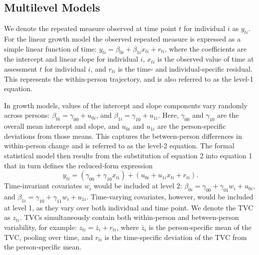 \subsection{Multilevel Models}
We denote the repeated measure observed at time point $t$ for individual $i$ as $y_{ti}$. For the linear growth model the observed repeated measure is expressed as a simple linear function of time: $y_{ti} = \beta_{0i} + \beta_{1i} x_{ti} + r_{ti}$, where the coefficients are the intercept and linear slope for individual $i$, $x_{ti}$ is the observed value of time at assessment $t$ for individual $i$, and $r_{ti}$ is the time- and individual-specific residual. This represents the within-person trajectory, and is also referred to as the level-1 equation. 

In growth models, values of the intercept and slope components vary randomly across persons: $\beta_{0i} = \gamma_{00} + u_{0i}$, and $\beta_{1i} = \gamma_{10} + u_{1i}$. Here, $\gamma_{00}$ and $\gamma_{10}$ are the overall mean intercept and slope, and $u_{0i}$ and $u_{1i}$ are the person-specific deviations from those means. This captures the between-person differences in within-person change and is referred to as the level-2 equation. The formal statistical model then results from the substitution of equation 2 into equation 1 that in turn defines the reduced-form expression
\begin{equation}
    y_{ti} = (\gamma_{00} + \gamma_{10} x_{ti}) + (u_{0i} + u_{1i} x_{ti} + r_{ti}).
\end{equation}
Time-invariant covariates $w_i$ would be included at level 2: $\beta_{0i} = \gamma_{00} + \gamma_{01} w_i + u_{0i}$, and $\beta_{1i} = \gamma_{10} + \gamma_{11} w_i + u_{1i}$. Time-varying covariates, however, would be included at level 1, as they vary over both individual and time point. We denote the TVC as $z_{ti}$. TVCs simultaneously contain both within-person and between-person variability, for example: $z_{ti} = \bar{z}_i + r_{ti}$, where $\bar{z}_i$ is the person-specific mean of the TVC, pooling over time, and $r_{ti}$ is the time-specific deviation of the TVC from the person-specific mean. 

